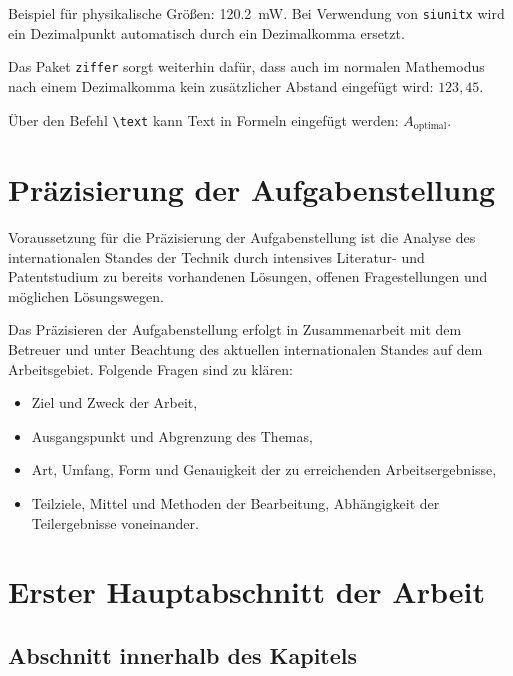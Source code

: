 \documentclass[%
  paper=a4,
  fontsize=12pt,
  twoside=false,
  headsepline=true,
  numbers=noenddot]{scrartcl}
\begin{document}
Beispiel für physikalische Größen: \SI{120.2}{\milli\watt}. Bei Verwendung von \texttt{siunitx} wird ein Dezimalpunkt automatisch durch ein Dezimalkomma ersetzt.

Das Paket \texttt{ziffer} sorgt weiterhin dafür, dass auch im normalen Mathemodus nach einem Dezimalkomma kein zusätzlicher Abstand eingefügt wird: $123,45$.

Über den Befehl \texttt{\textbackslash{}text} kann Text in Formeln eingefügt werden: $A_\text{optimal}$.




\section{Präzisierung der Aufgabenstellung}

Voraussetzung für die Präzisierung der Aufgabenstellung ist die Analyse des internationalen
Standes der Technik durch intensives Literatur- und Patentstudium zu
bereits vorhandenen Lösungen, offenen Fragestellungen und möglichen Lösungswegen.

Das Präzisieren der Aufgabenstellung erfolgt in Zusammenarbeit mit dem Betreuer und
unter Beachtung des aktuellen internationalen Standes auf dem Arbeitsgebiet. Folgende
Fragen sind zu klären:

\begin{itemize}
\item Ziel und Zweck der Arbeit,
\item Ausgangspunkt und Abgrenzung des Themas,
\item Art, Umfang, Form und Genauigkeit der zu erreichenden Arbeitsergebnisse,
\item Teilziele, Mittel und Methoden der Bearbeitung, Abhängigkeit der Teilergebnisse
voneinander.
\end{itemize}



\section{Erster Hauptabschnitt der Arbeit}
\subsection{Abschnitt innerhalb des Kapitels}
\end{document}
